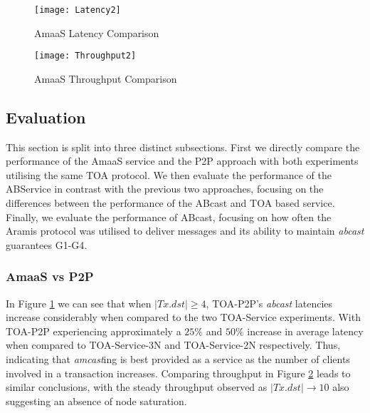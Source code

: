 	\begin{figure}[tp]
	 \texttt{[image: Latency2]}
	 \caption{AmaaS Latency Comparison}
	 \label{fig:LatencyGraph}
	\end{figure}
	
	\begin{figure}[bp]
	 \texttt{[image: Throughput2]}
	 \caption{AmaaS Throughput Comparison}
	 \label{fig:ThroughputGraph}
	\end{figure}	
	
	\clearpage
    \subsection{Evaluation}
    This section is split into three distinct subsections.  First we directly compare the performance of the \textsf{AmaaS} service and the P2P approach with both experiments utilising the same TOA protocol.  We then evaluate the performance of the ABService in contrast with the previous two approaches, focusing on the differences between the performance of the ABcast and TOA based service.  Finally, we evaluate the performance of \textsf{ABcast}, focusing on how often the \textsf{Aramis} protocol was utilised to deliver messages and its ability to maintain \emph{abcast} guarantees G1-G4.  
    
    \subsubsection*{AmaaS vs P2P}
	In Figure \ref{fig:LatencyGraph} we can see that when $|Tx.dst| \geq 4$, TOA-P2P's \emph{abcast} latencies increase considerably when compared to the two TOA-Service experiments.  With TOA-P2P experiencing approximately a $25\%$ and $50\%$ increase in average latency when compared to TOA-Service-3N and TOA-Service-2N respectively.  Thus, indicating that \emph{amcast}ing is best provided as a service as the number of clients involved in a transaction increases. Comparing throughput in Figure \ref{fig:ThroughputGraph} leads to similar conclusions, with the steady throughput observed as $|Tx.dst| \rightarrow 10$ also suggesting an absence of node saturation.  
	
